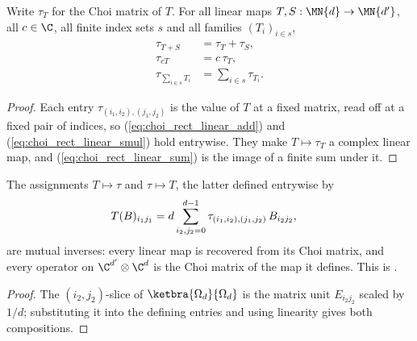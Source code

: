 \begin{lemma}
    \label{lem:choi_rect_linear}
    \leanok
    Write $\tau_T$ for the Choi matrix of $T$. For all linear maps
    $T,S:\MN{d}\to\MN{d'}$, all $c\in\C$, all finite index sets $s$ and all
    families $(T_i)_{i\in s}$,
    \begin{align}
        \tau_{T+S} &= \tau_T + \tau_S,
        \label{eq:choi_rect_linear_add}\\
        \tau_{cT} &= c\,\tau_T,
        \label{eq:choi_rect_linear_smul}\\
        \tau_{\sum_{i\in s}T_i} &= \sum_{i\in s}\tau_{T_i}.
        \label{eq:choi_rect_linear_sum}
    \end{align}
\end{lemma}

\begin{proof}
    \leanok
    Each entry $\tau_{(i_1,i_2),(j_1,j_2)}$ is the value of $T$ at a fixed
    matrix, read off at a fixed pair of indices, so
    (\ref{eq:choi_rect_linear_add}) and (\ref{eq:choi_rect_linear_smul}) hold
    entrywise. They make $T\mapsto\tau_T$ a complex linear map, and
    (\ref{eq:choi_rect_linear_sum}) is the image of a finite sum under it.
\end{proof}

\begin{theorem}
    \label{thm:choi_rect_mutual_inverse}
    \leanok
    The assignments $T\mapsto\tau$ and $\tau\mapsto T$, the latter defined
    entrywise by
    \begin{align}
        T(B)_{i_1 j_1}
          &= d\sum_{i_2,j_2=0}^{d-1}
            \tau_{(i_1,i_2),(j_1,j_2)}\,B_{i_2 j_2},
        \notag
    \end{align}
    are mutual inverses: every linear map is recovered from its Choi matrix,
    and every operator on $\C^{d'}\otimes\C^{d}$ is the Choi matrix of the
    map it defines. This is \cite[Proposition~2.1, Equation~(2.4)]{Wolf2012Quantum}.
\end{theorem}

\begin{proof}
    \leanok
    The $(i_2,j_2)$-slice of $\ketbra{\Omega_d}{\Omega_d}$ is the matrix
    unit $E_{i_2 j_2}$ scaled by $1/d$; substituting it into the defining
    entries and using linearity gives both compositions.
\end{proof}

